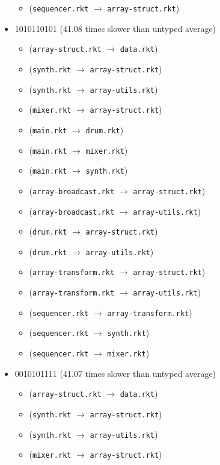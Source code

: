 \documentclass{article}
\newcommand{\mono}[1]{\texttt{#1}}
\begin{document}
\begin{itemize}
\begin{itemize}
  \item (\mono{sequencer.rkt} $\rightarrow$ \mono{array-struct.rkt})
  \end{itemize}
\item 1010110101 (41.08 times slower than untyped average)
  \begin{itemize}
  \item (\mono{array-struct.rkt} $\rightarrow$ \mono{data.rkt})
  \item (\mono{synth.rkt} $\rightarrow$ \mono{array-struct.rkt})
  \item (\mono{synth.rkt} $\rightarrow$ \mono{array-utils.rkt})
  \item (\mono{mixer.rkt} $\rightarrow$ \mono{array-struct.rkt})
  \item (\mono{main.rkt} $\rightarrow$ \mono{drum.rkt})
  \item (\mono{main.rkt} $\rightarrow$ \mono{mixer.rkt})
  \item (\mono{main.rkt} $\rightarrow$ \mono{synth.rkt})
  \item (\mono{array-broadcast.rkt} $\rightarrow$ \mono{array-struct.rkt})
  \item (\mono{array-broadcast.rkt} $\rightarrow$ \mono{array-utils.rkt})
  \item (\mono{drum.rkt} $\rightarrow$ \mono{array-struct.rkt})
  \item (\mono{drum.rkt} $\rightarrow$ \mono{array-utils.rkt})
  \item (\mono{array-transform.rkt} $\rightarrow$ \mono{array-struct.rkt})
  \item (\mono{array-transform.rkt} $\rightarrow$ \mono{array-utils.rkt})
  \item (\mono{sequencer.rkt} $\rightarrow$ \mono{array-transform.rkt})
  \item (\mono{sequencer.rkt} $\rightarrow$ \mono{synth.rkt})
  \item (\mono{sequencer.rkt} $\rightarrow$ \mono{mixer.rkt})
  \end{itemize}
\item 0010101111 (41.07 times slower than untyped average)
  \begin{itemize}
  \item (\mono{array-struct.rkt} $\rightarrow$ \mono{data.rkt})
  \item (\mono{synth.rkt} $\rightarrow$ \mono{array-struct.rkt})
  \item (\mono{synth.rkt} $\rightarrow$ \mono{array-utils.rkt})
  \item (\mono{mixer.rkt} $\rightarrow$ \mono{array-struct.rkt})

\end{itemize}
\end{itemize}
\end{document}

